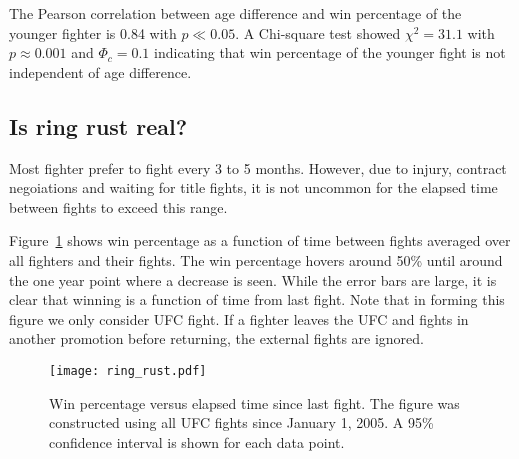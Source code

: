 The Pearson correlation between age difference and win percentage of the
younger fighter is 0.84 with $p \ll 0.05$. A Chi-square
test showed $\chi^2=31.1$ with $p \approx 0.001$ and $\Phi_c=0.1$ indicating that win percentage
of the younger fight is not independent of age difference.

\subsection*{Is ring rust real?}

Most fighter prefer to fight every 3 to 5 months. However, due to injury,
contract negoiations and waiting for title fights, it is not uncommon
for the elapsed time between fights to exceed this range.

Figure~\ref{ring_rust} shows win percentage as a function
of time between fights averaged over all fighters and their fights.
The win percentage hovers around 50\% until around the one year
point where a decrease is seen. While the error bars are large, it
is clear that winning is a function of time from last fight.
Note that in forming this figure we only consider UFC fight. If a fighter
leaves the UFC and fights in another promotion before returning, the
external fights are ignored.

\begin{figure}[h]
\begin{center}
\texttt{[image: ring\_rust.pdf]}
\caption{Win percentage versus elapsed time since last fight. The figure
was constructed using all UFC fights since January 1, 2005. A
95\% confidence interval is shown for each data point.}
\label{ring_rust}
\end{center}
\end{figure}
